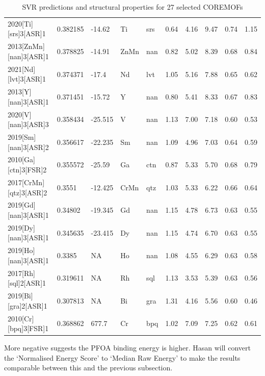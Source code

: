 \documentclass[twoside,twocolumn,9pt]{article}
\begin{document}
\begin{table}[t]
\begin{tabular}{@{}llllllllll@{}}
		2020{[}Ti{]}{[}srs{]}3{[}ASR{]}1   & 0.382185 & -14.62  & Ti   & srs & 0.64 & 4.16  & 9.47  & 0.74 & 1.15 \\
		2013{[}ZnMn{]}{[}nan{]}3{[}ASR{]}1 & 0.378825 & -14.91  & ZnMn & nan & 0.82 & 5.02  & 8.39  & 0.68 & 0.84 \\
		2021{[}Nd{]}{[}lvt{]}3{[}ASR{]}1   & 0.374371 & -17.4   & Nd   & lvt & 1.05 & 5.16  & 7.88  & 0.65 & 0.62 \\
		2013{[}Y{]}{[}nan{]}3{[}ASR{]}1    & 0.371451 & -15.72  & Y    & nan & 0.80 & 5.41  & 8.33  & 0.67 & 0.83 \\
		2020{[}V{]}{[}nan{]}3{[}ASR{]}3    & 0.358434 & -25.515 & V    & nan & 1.13 & 7.00  & 7.18  & 0.60 & 0.53 \\
		2019{[}Sm{]}{[}nan{]}3{[}ASR{]}2   & 0.356617 & -22.235 & Sm   & nan & 1.09 & 4.96  & 7.03  & 0.64 & 0.59 \\
		2010{[}Ga{]}{[}ctn{]}3{[}FSR{]}2   & 0.355572 & -25.59  & Ga   & ctn & 0.87 & 5.33  & 5.70  & 0.68 & 0.79 \\
		2017{[}CrMn{]}{[}qtz{]}3{[}ASR{]}2 & 0.3551   & -12.425 & CrMn & qtz & 1.03 & 5.33  & 6.22  & 0.66 & 0.64 \\
		2019{[}Gd{]}{[}nan{]}3{[}ASR{]}1   & 0.34802  & -19.345 & Gd   & nan & 1.15 & 4.78  & 6.73  & 0.63 & 0.55 \\
		2019{[}Dy{]}{[}nan{]}3{[}ASR{]}1   & 0.345635 & -23.415 & Dy   & nan & 1.15 & 4.74  & 6.70  & 0.63 & 0.55 \\
		2019{[}Ho{]}{[}nan{]}3{[}ASR{]}1   & 0.3385   & NA      & Ho   & nan & 1.08 & 4.55  & 6.29  & 0.63 & 0.58 \\
		2017{[}Rh{]}{[}sql{]}2{[}ASR{]}1   & 0.319611 & NA      & Rh   & sql & 1.13 & 3.53  & 5.39  & 0.63 & 0.56 \\
		2019{[}Bi{]}{[}gra{]}2{[}ASR{]}1   & 0.307813 & NA      & Bi   & gra & 1.31 & 4.16  & 5.56  & 0.60 & 0.46 \\
		2010{[}Cr{]}{[}bpq{]}3{[}FSR{]}1   & 0.368862 & 677.7   & Cr   & bpq & 1.02 & 7.09  & 7.25  & 0.62 & 0.61 \\
		\bottomrule
	\end{tabular}
	\caption{SVR predictions and structural properties for 27 selected COREMOFs}
	\label{tab:SVR-result}
\end{table}


\textcolor{myred}{More negative suggests the PFOA binding energy is higher. Hasan will convert the `Normalised Energy Score' to `Median Raw Energy' to make the results comparable between this and the previous subsection.}
\end{document}
